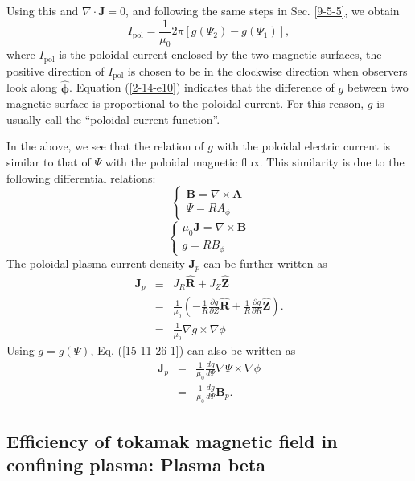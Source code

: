 \documentclass{article}
\newcommand{\tmmathbf}[1]{\ensuremath{\boldsymbol{#1}}}
\newcommand{\tmop}[1]{\ensuremath{\operatorname{#1}}}
\begin{document}
Using this and $\nabla \cdot \mathbf{J}= 0$, and following the same steps in
Sec. \ref{9-5-5}, we obtain
\begin{equation}
  \label{2-14-e10} I_{\tmop{pol}} = \frac{1}{\mu_0} 2 \pi [g (\Psi_2) - g
  (\Psi_1)],
\end{equation}
where $I_{\tmop{pol}}$ is the poloidal current enclosed by the two magnetic
surfaces, the positive direction of $I_{\tmop{pol}}$ is chosen to be in the
clockwise direction when observers look along $\hat{\tmmathbf{\phi}}$.
Equation (\ref{2-14-e10}) indicates that the difference of $g$ between two
magnetic surface is proportional to the poloidal current. For this reason, $g$
is usually call the ``poloidal current function''.

In the above, we see that the relation of $g$ with the poloidal electric
current is similar to that of $\Psi$ with the poloidal magnetic flux. This
similarity is due to the following differential relations:
\[ \left\{ \begin{array}{l}
     \mathbf{B}= \nabla \times \mathbf{A}\\
     \Psi = R A_{\phi}
   \end{array} \right. \]
\[ \left\{ \begin{array}{l}
     \mu_0 \mathbf{J}= \nabla \times \mathbf{B}\\
     g = R B_{\phi}
   \end{array} \right. \]
The poloidal plasma current density $\mathbf{J}_p$ can be further written as
\begin{eqnarray}
  \mathbf{J}_p & \equiv & J_R \hat{\mathbf{R}} + J_Z \hat{\mathbf{Z}}
  \nonumber\\
  & = & \frac{1}{\mu_0} \left( - \frac{1}{R}  \frac{\partial g}{\partial Z}
  \hat{\mathbf{R}} + \frac{1}{R} \frac{\partial g}{\partial R}
  \hat{\mathbf{Z}} \right) . \nonumber\\
  & = & \frac{1}{\mu_0} \nabla g \times \nabla \phi  \label{15-11-26-1}
\end{eqnarray}
Using $g = g (\Psi)$, Eq. (\ref{15-11-26-1}) can also be written as
\begin{eqnarray}
  \mathbf{J}_p & = & \frac{1}{\mu_0}  \frac{d g}{d \Psi} \nabla \Psi \times
  \nabla \phi \nonumber\\
  & = & \frac{1}{\mu_0}  \frac{d g}{d \Psi} \mathbf{B}_p . 
\end{eqnarray}
\subsection{Efficiency of tokamak magnetic field in confining plasma: Plasma
beta}\label{2015-5-31-p1}
\end{document}
